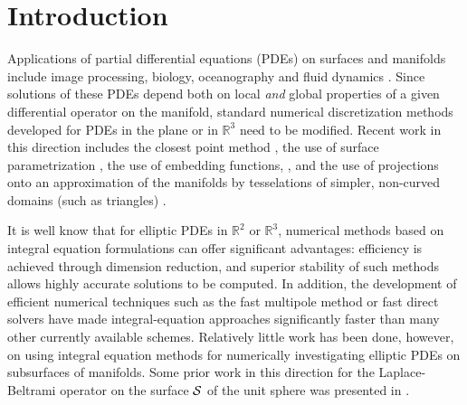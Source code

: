 \section{Introduction}

Applications of partial differential equations (PDEs) on surfaces and manifolds include image processing, biology, oceanography and fluid dynamics \cite{Witkin,Myers,Chaplain}. Since solutions of these PDEs depend both on local {\it and} global properties of a given differential operator on the manifold, standard numerical discretization methods developed for PDEs in the plane or in  $\mathbb{R}^3$ need to be modified. Recent work in this direction includes the closest point method \cite{ruuth}, the use of surface parametrization \cite{floater},  the use of embedding functions, \cite{Bertalmio}, and the use of projections onto an approximation of the manifolds by tesselations of simpler, non-curved domains (such as triangles) \cite{lindblom}. 

It is well know that for elliptic PDEs in $\mathbb{R}^2$ or $\mathbb{R}^3$, numerical methods based on integral equation formulations can offer significant advantages: efficiency is achieved through dimension reduction, and superior stability of such methods allows highly accurate solutions to be computed. 
In addition, the development of efficient numerical techniques such as the fast multipole method or fast direct solvers have made integral-equation approaches significantly faster than many other currently available schemes. 
Relatively little work has been done, however, on using integral equation methods for numerically investigating elliptic PDEs on subsurfaces of manifolds. 
Some prior work in this direction for the Laplace-Beltrami operator on the surface $\cal{S}$ of the unit sphere was presented in \cite{gemmrich,kro:nig2013}.

